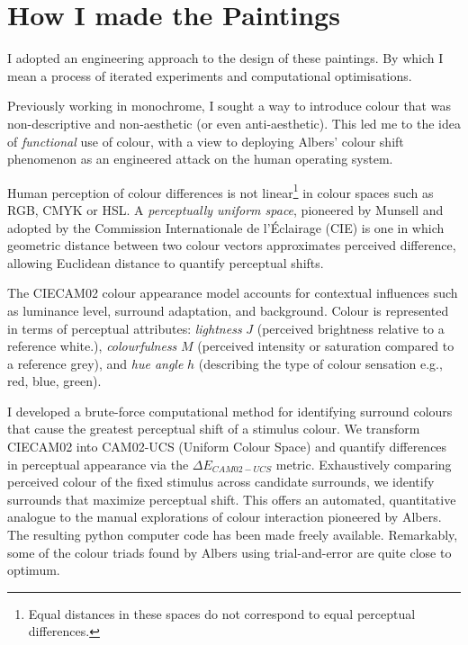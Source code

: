 \documentclass[12pt]{article}
\begin{document}
\section{How I made the Paintings}\label{sec:process}
I adopted an engineering approach to the design of these paintings. By
which I mean a process of iterated experiments and computational
optimisations.

Previously working in monochrome, I sought a way to introduce
colour that was non-descriptive and non-aesthetic (or even
anti-aesthetic). This led me to the idea of \emph{functional} use of
colour, with a view to deploying Albers' colour shift phenomenon
as an engineered attack on the human operating system.

Human perception of colour differences\cite{MacAdam1942} is not
linear\footnote{Equal distances in these spaces do not correspond to
  equal perceptual differences.} in colour spaces such as RGB, CMYK or
HSL.\cite{Luo2001CIECAM02}  A \emph{perceptually uniform space},
pioneered by Munsell\cite{Munsell1915} and adopted by the Commission
Internationale de l'\'{E}clairage
(CIE)\cite{CIE1976,CIE1978Uniform,Luo2001CIEDE2000} is one in which
geometric distance between two colour vectors approximates perceived
difference, allowing Euclidean distance to quantify perceptual shifts.

The CIECAM02 colour appearance
model\cite{Luo2001CIECAM02,CIE1592004} accounts for
contextual influences such as luminance level, surround adaptation,
and background. Colour is represented in terms of perceptual
attributes: \emph{lightness} $J$ (perceived brightness relative to a
reference white.), \emph{colourfulness} $M$ (perceived intensity or
saturation compared to a reference grey), and \emph{hue angle} $h$
(describing the type of colour sensation e.g., red, blue, green).

I developed a brute-force computational method for identifying
surround colours that cause the greatest perceptual shift of a
stimulus colour. We transform CIECAM02 into CAM02-UCS (Uniform Colour
Space) and quantify differences in perceptual appearance via the
$\Delta E_{CAM02-UCS}$ metric. Exhaustively comparing perceived colour
of the fixed stimulus across candidate surrounds, we identify
surrounds that maximize perceptual shift. This offers an automated,
quantitative analogue to the manual explorations of colour interaction
pioneered by Albers.\cite{albers} The resulting python computer code
has been made freely
available.\cite{grant2025colourshift} Remarkably, some of the colour
triads found by Albers using trial-and-error are quite close to
optimum.
\end{document}

